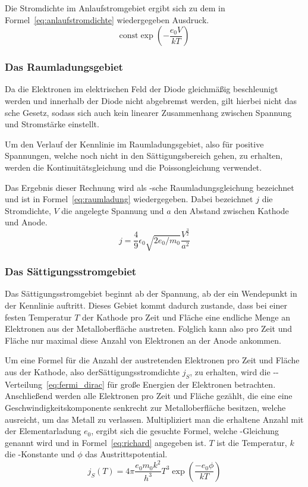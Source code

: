 Die Stromdichte im Anlaufstromgebiet ergibt sich zu dem in
Formel~\eqref{eq:anlaufstromdichte} wiedergegeben Ausdruck.
\begin{equation}
\text{const}\exp{\left(-\frac{e_0V}{kT}\right)}
\label{eq:anlaufstromdichte}
\end{equation}
%
\subsubsection{Das Raumladungsgebiet}
%
Da die Elektronen im elektrischen Feld der Diode gleichmäßig beschleunigt werden und innerhalb der Diode nicht abgebremst werden, gilt hierbei nicht das sche Gesetz, sodass sich auch kein linearer Zusammenhang zwischen Spannung und Stromstärke einstellt.

Um den Verlauf der Kennlinie im Raumladungsgebiet, also für positive Spannungen, welche noch nicht in den Sättigungsbereich gehen, zu erhalten, werden die Kontinuitätsgleichung und die Poissongleichung verwendet.

Das Ergebnis dieser Rechnung wird als -sche Raumladungsgleichung bezeichnet und ist in Formel~\eqref{eq:raumladung} wiedergegeben. Dabei bezeichnet $j$ die Stromdichte, $V$ die angelegte Spannung und $a$ den Abstand zwischen Kathode und Anode.
\begin{equation}
j = \frac{4}{9} \epsilon_0 \sqrt{2e_0/m_0} \frac{V^{\frac{3}{2}}}{a^2}
\label{eq:raumladung}
\end{equation}
%
\subsubsection{Das Sättigungsstromgebiet}
%
Das Sättigungsstromgebiet beginnt ab der Spannung, ab der ein Wendepunkt in der Kennlinie auftritt. Dieses Gebiet kommt dadurch zustande, dass bei einer festen Temperatur $T$ der Kathode pro Zeit und Fläche eine endliche Menge an Elektronen aus der Metalloberfläche austreten. Folglich kann also pro Zeit und Fläche nur maximal diese Anzahl von Elektronen an der Anode ankommen.

Um eine Formel für die Anzahl der austretenden Elektronen pro Zeit und Fläche aus der Kathode, also derSättigungsstromdichte $j_S$, zu erhalten, wird die --Verteilung~\eqref{eq:fermi_dirac} für große Energien der Elektronen betrachten.
Anschließend werden alle Elektronen pro Zeit und Fläche gezählt, die eine eine Geschwindigkeitskomponente senkrecht zur Metalloberfläche besitzen, welche ausreicht, um das Metall zu verlassen. Multipliziert man die erhaltene Anzahl mit der Elementarladung $e_0$, ergibt sich die gesuchte Formel, welche -Gleichung genannt wird und in Formel~\eqref{eq:richard} angegeben ist. $T$ ist die Temperatur, $k$ die -Konstante und $\phi$ das Austrittspotential.
%
\begin{equation}
j_S(T) = 4\pi\frac{e_0m_0k^2}{h^3}T^3\exp{\left(\frac{-e_0\phi}{kT}\right)}
\label{eq:richard}
\end{equation}
%
